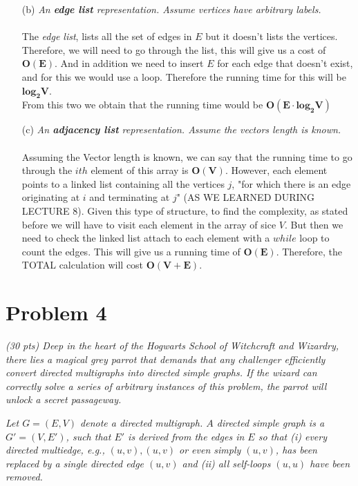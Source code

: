 \documentclass[12pt]{article} \setlength{\oddsidemargin}{0in}
\begin{document}
\begin{enumerate}
\item[(b)]{\textit{An \textbf{edge list} representation. Assume
      vertices have arbitrary labels.}}
  \\\\
  The \textit{edge list}, lists all the set of edges in $E$ but it doesn't lists the vertices. Therefore, we will need to go through the list, this will give us a cost of $\mathbf{O(E)}$. And in addition we need to insert $E$ for each edge that doesn't exist, and for this we would use a loop. Therefore the running time for this will be $\mathbf{log_2V}$.\\
  From this two we obtain that the running time would be $\mathbf{O(E \cdot log_2 V)}$  \\
\item[(c)]{\textit{An \textbf{adjacency list} representation. Assume
      the vectors length is known.}}
  \\\\
  Assuming the Vector length is known, we can say that the running time to go through the $ith$ element of this array is $\mathbf{O(V)}$. However, each element points to a linked list containing all the vertices $j$, "for which there is an edge originating at $i$ and terminating at $j$" (AS WE LEARNED DURING LECTURE 8). Given this type of structure, to find the complexity, as stated before we will have to visit each element in the array of sice $V$. But then we need to check the linked list attach to each element with a $while$ loop to count the edges. This will give us a running time of $\mathbf{O(E)}$. Therefore, the TOTAL calculation will cost $\mathbf{O(V+E)}$. 

\end{enumerate}

\newpage
\section*{Problem 4}

\textit{(30 pts) Deep in the heart of the Hogwarts School of
  Witchcraft and Wizardry, there lies a magical grey parrot that
  demands that any challenger efficiently convert directed multigraphs
  into directed simple graphs. If the wizard can correctly solve a
  series of arbitrary instances of this problem, the parrot will
  unlock a secret passageway.}

\textit{Let $G = (E, V)$ denote a directed multigraph. $A$ directed
  simple graph is a $G' = (V, E')$, such that $E'$ is derived from the
  edges in $E$ so that (i) every directed multiedge, e.g.,
  ${(u, v), (u, v)}$ or even simply ${(u, v)}$, has been replaced by a
  single directed edge ${(u, v)}$ and (ii) all self-loops $(u, u)$
  have been removed.}
\end{document}
